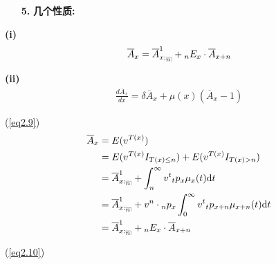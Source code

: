 \documentclass[a4paper,10pt]{ctexbook}
\makeatletter
\newcommand{\hei}{\CJKfamily{hei}}      %
\DeclareRobustCommand{\annu}[1]{_{%
    \def\arraystretch{0}%
    \setlength\arraycolsep{1pt}%
    \setlength\arrayrulewidth{.2pt}%
    \begin{array}[b]{@{}c|}\hline
        \\[\arraycolsep]%
        \scriptstyle #1%
    \end{array}%
}}
\makeatother
\begin{document}
\begin{itemize}
    \item[{\bf\hei 5.}]{\bf\hei 几个性质: }
\end{itemize}

{\rm\bf(i)} \begin{align}\label{eq2.9}
    \overline{A}_x = \overline{A}_{x:\annu{n}}^1 + {}_nE_{x}\cdot \overline{A}_{x+n}\end{align}

{\rm\bf(ii)} \begin{align}\label{eq2.10}
    \frac{d\overline{A}_x}{dx} = \delta \overline{A}_x + \mu(x)(\overline{A}_x - 1)\end{align}

\proof (\ref{eq2.9})
\begin{align*}
    \overline{A}_x & = E(v^{T(x)})                                                                                           \\
                   & = E(v^{T(x)}I_{T(x)\leq n}) + E(v^{T(x)}I_{T(x)> n})                                                    \\
                   & = \overline{A}_{x:\annu{n}}^1 + \int_n^\infty v^t{}_tp_x\mu_x(t)\mathrm{d}t                             \\
                   & = \overline{A}_{x:\annu{n}}^1 + v^n\cdot {}_np_x\int_0^\infty v^{t}{}_{t}p_{x+n}\mu_{x+n}(t)\mathrm{d}t \\
                   & = \overline{A}_{x:\annu{n}}^1 + {}_nE_{x}\cdot \overline{A}_{x+n}
\end{align*}

(\ref{eq2.10})
\end{document}
